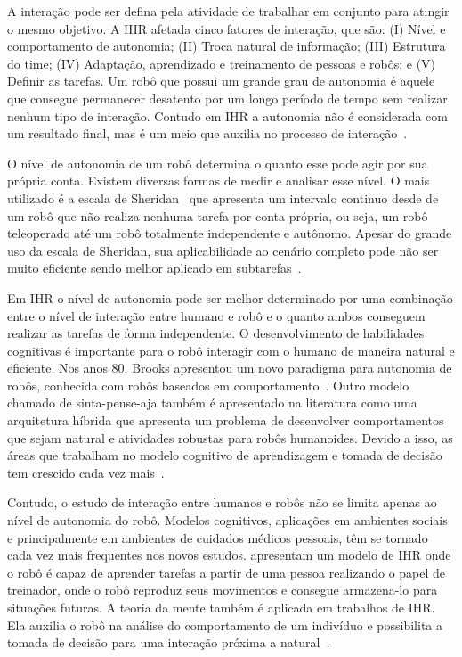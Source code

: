 A interação pode ser defina pela atividade de trabalhar em conjunto para atingir o mesmo objetivo. A IHR afetada cinco fatores de interação, que são: (I) Nível e comportamento de autonomia; (II) Troca natural de informação; (III) Estrutura do time; (IV) Adaptação, aprendizado e treinamento de pessoas e robôs; e (V) Definir as tarefas. Um robô que possui um grande grau de autonomia é aquele que consegue permanecer desatento por um longo período de tempo sem realizar nenhum tipo de interação. Contudo em IHR a autonomia não é considerada com um resultado final, mas é um meio que auxilia no processo de interação~\cite{Goodrich:2007, Weiss:2010}.

O nível de autonomia de um robô determina o quanto esse pode agir por sua própria conta. Existem diversas formas de medir e analisar esse nível. O mais utilizado é a escala de Sheridan~\cite{Sheridan:1978} que apresenta um intervalo continuo desde de um robô que não realiza nenhuma tarefa por conta própria, ou seja, um robô teleoperado até um robô totalmente independente e autônomo. Apesar do grande uso da escala de Sheridan, sua aplicabilidade ao cenário completo pode não ser muito eficiente sendo melhor aplicado em subtarefas~\cite{Goodrich:2007, Weiss:2010}.

Em IHR o nível de autonomia pode ser melhor determinado por uma combinação entre o nível de interação entre humano e robô e o quanto ambos conseguem realizar as tarefas de forma independente. O desenvolvimento de habilidades cognitivas é importante para o robô interagir com o humano de maneira natural e eficiente. Nos anos 80, Brooks apresentou um novo paradigma para autonomia de robôs, conhecida com robôs baseados em comportamento~\cite{Brooks:1986, Brooks:1991}. Outro modelo chamado de sinta-pense-aja também é apresentado na literatura como uma arquitetura híbrida que apresenta um problema de desenvolver comportamentos que sejam natural e atividades robustas para robôs humanoides. Devido a isso, as áreas que trabalham no modelo cognitivo de aprendizagem e tomada de decisão tem crescido cada vez mais~\cite{Goodrich:2007}.

Contudo, o estudo de interação entre humanos e robôs não se limita apenas ao nível de autonomia do robô. Modelos cognitivos, aplicações em ambientes sociais e principalmente em ambientes de cuidados médicos pessoais, têm se tornado cada vez mais frequentes nos novos estudos.  apresentam um modelo de IHR onde o robô é capaz de aprender tarefas a partir de uma pessoa realizando o papel de treinador, onde o robô reproduz seus movimentos e consegue armazena-lo para situações futuras. A teoria da mente também é aplicada em trabalhos de IHR. Ela auxilia o robô na análise do comportamento de um indivíduo e possibilita a tomada de decisão para uma interação próxima a natural~\cite{Hiatt:2011}.

